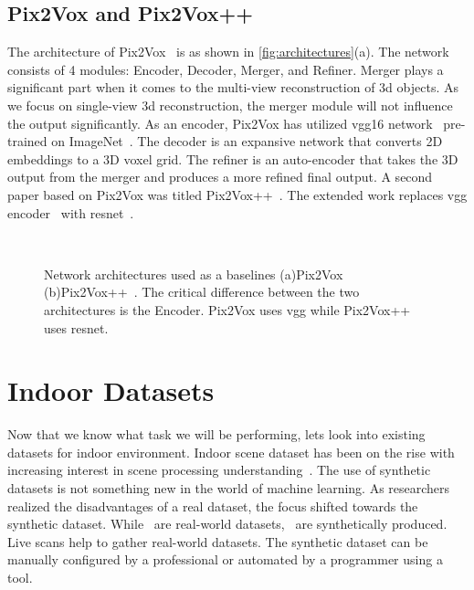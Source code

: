 \subsection{Pix2Vox and Pix2Vox++}\label{subsec:pix2vox-and-pix2vox++}
The architecture of Pix2Vox~\cite{Xie_2019} is as shown in \autoref{fig:architectures}(a).
The network consists of 4 modules: Encoder, Decoder, Merger, and Refiner.
Merger plays a significant part when it comes to the multi-view reconstruction of 3d objects.
As we focus on single-view 3d reconstruction, the merger module will not influence the output significantly.
As an encoder, Pix2Vox has utilized \gls{vgg}16 network~\cite{simonyan2015deep} pre-trained on ImageNet~\cite{Deng2009ImageNetAL}.
The decoder is an expansive network that converts 2D embeddings to a 3D voxel grid.
The refiner is an auto-encoder that takes the 3D output from the merger and produces a more refined final output.
A second paper based on Pix2Vox was titled Pix2Vox++~\cite{Xie_2020}.
The extended work replaces \gls{vgg} encoder~\cite{simonyan2015deep} with \gls{resnet}~\cite{He2016DeepRL}.

\begin{figure}[!ht]
    \centering
    \quad
    \\
    \caption[Network Architecture for Baselines.]{Network architectures used as a baselines (a)Pix2Vox~\cite{Xie_2019} (b)Pix2Vox++~\cite{Xie_2020}.
    The critical difference between the two architectures is the Encoder. Pix2Vox uses \gls{vgg} while Pix2Vox++ uses \gls{resnet}.}
    \label{fig:architectures}
\end{figure}

\section{Indoor Datasets}\label{sec:indoor-dataset}

Now that we know what task we will be performing, lets look into existing datasets for indoor environment.
Indoor scene dataset has been on the rise with increasing interest in scene processing understanding~\cite{Dai2017,Silberman2012,Xiao2013SUN3DAD,Hua2016SceneNNAS,Armeni20163DSP,Chang2018,Handa2016UnderstandingRI,InteriorNet18,Li_2021_CVPR,zheng2020structured3d,Roberts2020HypersimAP,McCormac2017}.
The use of synthetic datasets is not something new in the world of machine learning.
As researchers realized the disadvantages of a real dataset, the focus shifted towards the synthetic dataset.
While~\cite{Dai2017, Lim2013, Sun2018} are real-world datasets,~\cite{Fu20203DFRONT3F,Handa2016UnderstandingRI,McCormac2017,Roberts2020HypersimAP} are synthetically produced.
Live scans help to gather real-world datasets.
The synthetic dataset can be manually configured by a professional or automated by a programmer using a tool.

